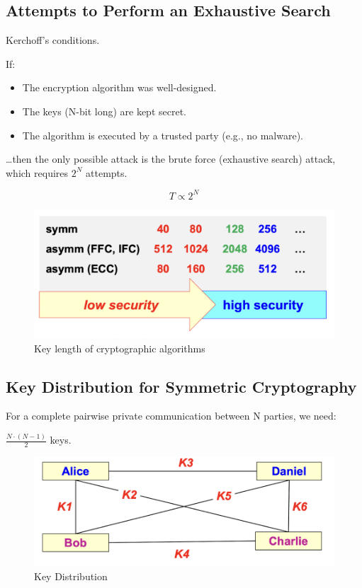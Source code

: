 \subsection*{Attempts to Perform an Exhaustive Search}
\begin{center}
    Kerchoff's conditions.
\end{center}

If:
\begin{itemize}
    \item The encryption algorithm was well-designed.
    \item The keys (N-bit long) are kept secret.
    \item The algorithm is executed by a trusted party (e.g., no malware).
\end{itemize}
\dots then the only possible attack is the brute force (exhaustive search) attack, which requires $2^N$ attempts.

\[
    \boxed{T \propto 2^N}
\]

\begin{figure}[H]
    \centering
    \includegraphics[width=0.5\linewidth]{Images/Cryptography/crypto_key_lens.png}
    \caption{Key length of cryptographic algorithms}
\end{figure}

\subsection{Key Distribution for Symmetric Cryptography}
\raggedcolumns
\begin{multicols}{2}

\noindent For a complete pairwise private communication between N parties, we need:
\begin{center}
    $\displaystyle\frac{N \cdot (N-1)}{2}$ keys.
\end{center}

\columnbreak

    \begin{figure}[H]
        \centering
        \includegraphics[width=\linewidth]{Images/Cryptography/key_dist_symm.png}
        \caption{Key Distribution}
    \end{figure}
\end{multicols}


